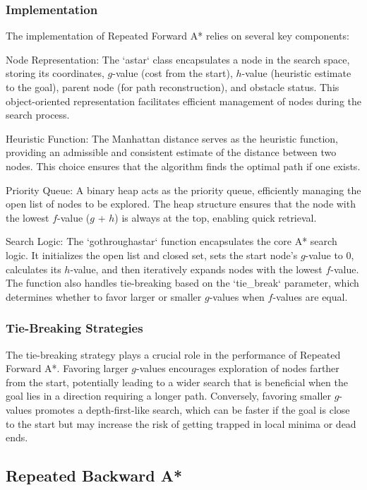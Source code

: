 \documentclass[12pt]{article}
\begin{document}
\subsubsection{Implementation}

The implementation of Repeated Forward A* relies on several key components:

Node Representation: The `astar` class encapsulates a node in the search space, storing its coordinates, $g$-value (cost from the start), $h$-value (heuristic estimate to the goal), parent node (for path reconstruction), and obstacle status. This object-oriented representation facilitates efficient management of nodes during the search process.

Heuristic Function: The Manhattan distance serves as the heuristic function, providing an admissible and consistent estimate of the distance between two nodes. This choice ensures that the algorithm finds the optimal path if one exists.

Priority Queue: A binary heap acts as the priority queue, efficiently managing the open list of nodes to be explored. The heap structure ensures that the node with the lowest $f$-value ($g$ + $h$) is always at the top, enabling quick retrieval.

Search Logic: The `gothroughastar` function encapsulates the core A* search logic. It initializes the open list and closed set, sets the start node's $g$-value to 0, calculates its $h$-value, and then iteratively expands nodes with the lowest $f$-value. The function also handles tie-breaking based on the `tie\_break` parameter, which determines whether to favor larger or smaller $g$-values when $f$-values are equal.

\subsubsection{Tie-Breaking Strategies}

The tie-breaking strategy plays a crucial role in the performance of Repeated Forward A*. Favoring larger $g$-values encourages exploration of nodes farther from the start, potentially leading to a wider search that is beneficial when the goal lies in a direction requiring a longer path. Conversely, favoring smaller $g$-values promotes a depth-first-like search, which can be faster if the goal is close to the start but may increase the risk of getting trapped in local minima or dead ends.

\subsection{Repeated Backward A*}
\end{document}
